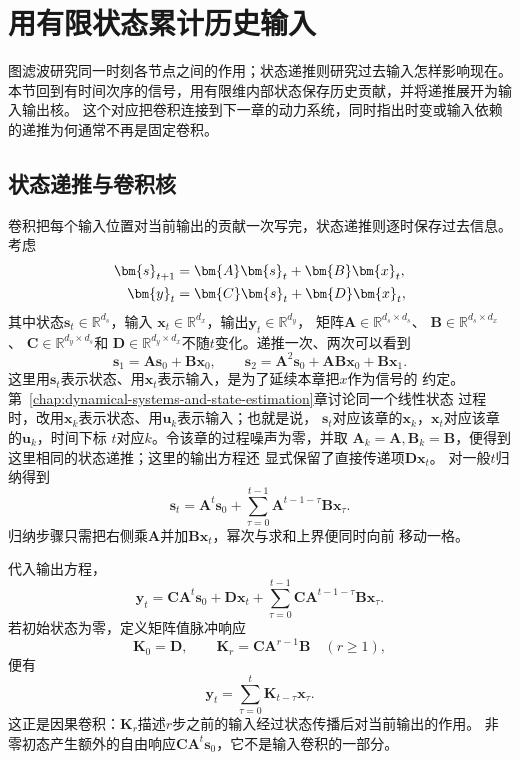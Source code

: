 \section{用有限状态累计历史输入}
\label{sec:signal-analysis-state-history-kernels}

图滤波研究同一时刻各节点之间的作用；状态递推则研究过去输入怎样影响现在。
本节回到有时间次序的信号，用有限维内部状态保存历史贡献，并将递推展开为输入输出核。
这个对应把卷积连接到下一章的动力系统，同时指出时变或输入依赖的递推为何通常不再是固定卷积。

\subsection{状态递推与卷积核}

卷积把每个输入位置对当前输出的贡献一次写完，状态递推则逐时保存过去信息。考虑
\begin{align}
  \bm{s}_{t+1}
  &=
  \bm{A}\bm{s}_t+\bm{B}\bm{x}_t,
  \notag\\
  \bm{y}_t
  &=
  \bm{C}\bm{s}_t+\bm{D}\bm{x}_t,
  \label{eq:signal-analysis-lti-state-space}
\end{align}
其中状态$\bm{s}_t\in\mathbb{R}^{d_s}$，输入
$\bm{x}_t\in\mathbb{R}^{d_x}$，输出$\bm{y}_t\in\mathbb{R}^{d_y}$，
矩阵$\bm{A}\in\mathbb{R}^{d_s\times d_s}$、
$\bm{B}\in\mathbb{R}^{d_s\times d_x}$、
$\bm{C}\in\mathbb{R}^{d_y\times d_s}$和
$\bm{D}\in\mathbb{R}^{d_y\times d_x}$不随$t$变化。递推一次、两次可以看到
\[
  \bm{s}_1=\bm{A}\bm{s}_0+\bm{B}\bm{x}_0,\qquad
  \bm{s}_2=\bm{A}^2\bm{s}_0+\bm{A}\bm{B}\bm{x}_0+\bm{B}\bm{x}_1.
\]
这里用$\bm{s}_t$表示状态、用$\bm{x}_t$表示输入，是为了延续本章把$x$作为信号的
约定。第~\ref{chap:dynamical-systems-and-state-estimation}章讨论同一个线性状态
过程时，改用$\bm{x}_k$表示状态、用$\bm{u}_k$表示输入；也就是说，
$\bm{s}_t$对应该章的$\bm{x}_k$，$\bm{x}_t$对应该章的$\bm{u}_k$，时间下标
$t$对应$k$。令该章的过程噪声为零，并取
$\bm{A}_k=\bm{A},\bm{B}_k=\bm{B}$，便得到这里相同的状态递推；这里的输出方程还
显式保留了直接传递项$\bm{D}\bm{x}_t$。
对一般$t$归纳得到
\begin{equation}
  \bm{s}_t
  =
  \bm{A}^t\bm{s}_0
  +
  \sum_{\tau=0}^{t-1}
  \bm{A}^{t-1-\tau}\bm{B}\bm{x}_{\tau}.
  \label{eq:signal-analysis-state-unrolling}
\end{equation}
归纳步骤只需把右侧乘$\bm{A}$并加$\bm{B}\bm{x}_t$，幂次与求和上界便同时向前
移动一格。

代入输出方程，
\begin{equation}
  \bm{y}_t
  =
  \bm{C}\bm{A}^t\bm{s}_0
  +
  \bm{D}\bm{x}_t
  +
  \sum_{\tau=0}^{t-1}
  \bm{C}\bm{A}^{t-1-\tau}\bm{B}\bm{x}_{\tau}.
  \label{eq:signal-analysis-state-convolution}
\end{equation}
若初始状态为零，定义矩阵值脉冲响应
\begin{equation}
  \bm{K}_0=\bm{D},\qquad
  \bm{K}_r=\bm{C}\bm{A}^{r-1}\bm{B}\quad(r\geq1),
  \label{eq:signal-analysis-state-kernel}
\end{equation}
便有
\[
  \bm{y}_t
  =
  \sum_{\tau=0}^{t}\bm{K}_{t-\tau}\bm{x}_{\tau}.
\]
这正是因果卷积：$\bm{K}_r$描述$r$步之前的输入经过状态传播后对当前输出的作用。
非零初态产生额外的自由响应$\bm{C}\bm{A}^t\bm{s}_0$，它不是输入卷积的一部分。

